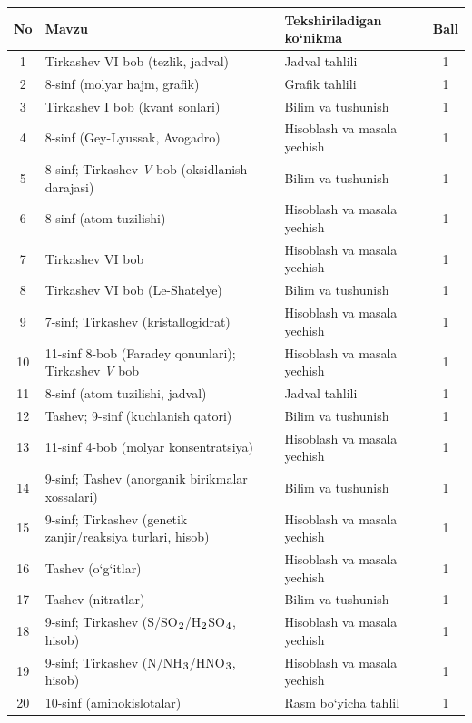 \documentclass[11pt,a4paper]{article}
\renewcommand{\textsubscript}[1]{\ensuremath{_{\text{\fontsize{8}{8}\selectfont #1}}}}
\begin{document}
{\small\noindent\begin{longtable}{|c|p{7.2cm}|p{5.4cm}|c|}\hline \textbf{No} & \textbf{Mavzu} & \textbf{Tekshiriladigan ko`nikma} & \textbf{Ball}\\\hline
1 & Tirkashev VI bob (tezlik, jadval) & Jadval tahlili & 1\\\hline
2 & 8-sinf (molyar hajm, grafik) & Grafik tahlili & 1\\\hline
3 & Tirkashev I bob (kvant sonlari) & Bilim va tushunish & 1\\\hline
4 & 8-sinf (Gey-Lyussak, Avogadro) & Hisoblash va masala yechish & 1\\\hline
5 & 8-sinf; Tirkashev \textit{V} bob (oksidlanish darajasi) & Bilim va tushunish & 1\\\hline
6 & 8-sinf (atom tuzilishi) & Hisoblash va masala yechish & 1\\\hline
7 & Tirkashev VI bob & Hisoblash va masala yechish & 1\\\hline
8 & Tirkashev VI bob (Le-Shatelye) & Bilim va tushunish & 1\\\hline
9 & 7-sinf; Tirkashev (kristallogidrat) & Hisoblash va masala yechish & 1\\\hline
10 & 11-sinf 8-bob (Faradey qonunlari); Tirkashev \textit{V} bob & Hisoblash va masala yechish & 1\\\hline
11 & 8-sinf (atom tuzilishi, jadval) & Jadval tahlili & 1\\\hline
12 & Tashev; 9-sinf (kuchlanish qatori) & Bilim va tushunish & 1\\\hline
13 & 11-sinf 4-bob (molyar konsentratsiya) & Hisoblash va masala yechish & 1\\\hline
14 & 9-sinf; Tashev (anorganik birikmalar xossalari) & Bilim va tushunish & 1\\\hline
15 & 9-sinf; Tirkashev (genetik zanjir/reaksiya turlari, hisob) & Hisoblash va masala yechish & 1\\\hline
16 & Tashev (o`g`itlar) & Hisoblash va masala yechish & 1\\\hline
17 & Tashev (nitratlar) & Bilim va tushunish & 1\\\hline
18 & 9-sinf; Tirkashev (S/SO\textsubscript{2}/H\textsubscript{2}SO\textsubscript{4}, hisob) & Hisoblash va masala yechish & 1\\\hline
19 & 9-sinf; Tirkashev (N/NH\textsubscript{3}/HNO\textsubscript{3}, hisob) & Hisoblash va masala yechish & 1\\\hline
20 & 10-sinf (aminokislotalar) & Rasm bo`yicha tahlil & 1\\\hline

\end{longtable}}
\end{document}
